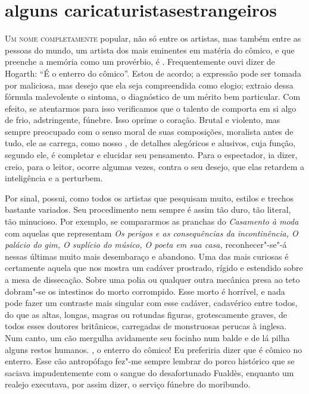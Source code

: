 \chapter[Alguns caricaturistas estrangeiros]{alguns
caricaturistas\break estrangeiros}

\vspace{-1cm}

\sectionitem

\noindent\textsc{Um nome completamente} popular, não só entre os artistas, mas também
entre as pessoas do mundo, um artista dos mais eminentes em matéria do
cômico, e que preenche a memória como um provérbio, é .
Frequentemente ouvi dizer de Hogarth: “É o enterro do cômico”. Estou de
acordo; a expressão pode ser tomada por maliciosa, mas desejo que ela
seja compreendida como elogio; extraio dessa fórmula malevolente o
sintoma, o diagnóstico de um mérito bem particular. Com efeito, se
atentarmos para isso verificamos que o talento de  comporta em
si algo de frio, adstringente, fúnebre. Isso oprime o coração. Brutal e
violento, mas sempre preocupado com o senso moral de suas composições,
moralista antes de tudo, ele as carrega, como nosso , de
detalhes alegóricos e alusivos, cuja função, segundo ele, é completar e
elucidar seu pensamento. Para o espectador, ia dizer, creio, para o
leitor, ocorre algumas vezes, contra o seu desejo, que elas retardem a
inteligência e a perturbem.

Por sinal,  possui, como todos os artistas que pesquisam muito,
estilos e trechos bastante variados. Seu procedimento nem sempre é
assim tão duro, tão literal, tão minucioso. Por exemplo, se compararmos
as pranchas do \textit{Casamento à moda} com aquelas que representam
\textit{Os perigos e as consequências da incontinência, O palácio do
gim, O suplício do músico, O poeta em sua casa,} reconhecer"-se"-á nessas
últimas muito mais desembaraço e abandono. Uma das mais curiosas é
certamente aquela que nos mostra um cadáver prostrado, rígido e
estendido sobre a mesa de dissecação. Sobre uma polia ou qualquer outra
mecânica presa ao teto dobram"-se os intestinos do morto corrompido.
Esse morto é horrível, e nada pode fazer um contraste mais singular com
esse cadáver, cadavérico entre todos, do que as altas, longas, magras
ou rotundas figuras, grotescamente graves, de todos esses doutores
britânicos, carregadas de monstruosas perucas à inglesa. Num canto, um
cão mergulha avidamente seu focinho num balde e de lá pilha alguns
restos humanos. , o enterro do cômico! Eu preferiria dizer que é
cômico no enterro. Esse cão antropófago fez"-me sempre lembrar do porco
histórico que se saciava impudentemente com o sangue do desafortunado
Fualdès, enquanto um realejo executava, por assim dizer, o serviço	
fúnebre do moribundo.

